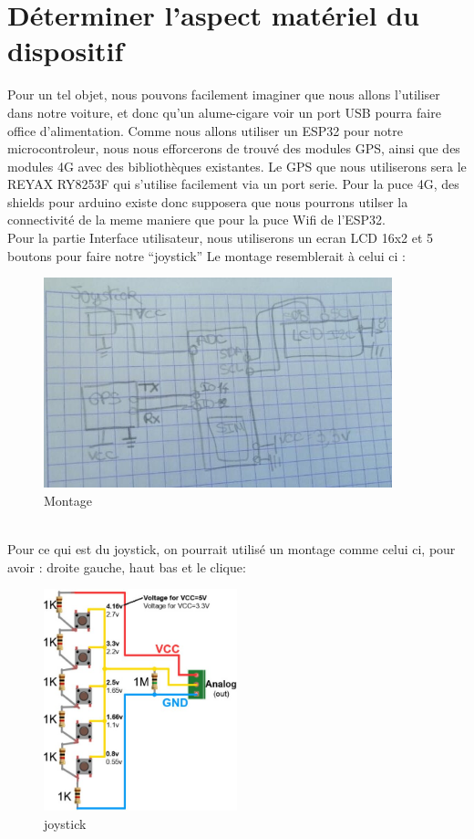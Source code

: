 \documentclass[10pt,a4paper]{article}
\begin{document}
\section{Déterminer l'aspect matériel du dispositif}
 
 Pour un tel objet, nous pouvons facilement imaginer que nous allons l'utiliser dans notre voiture, et donc qu'un alume-cigare voir un port USB pourra faire office d'alimentation. 
 Comme nous allons utiliser un ESP32 pour notre microcontroleur, nous nous efforcerons de trouvé des modules GPS, ainsi que des modules 4G avec des bibliothèques existantes.
 Le GPS que nous utiliserons sera le REYAX RY8253F qui s'utilise facilement via un port serie. 
 Pour la puce 4G, des shields pour arduino existe donc supposera que nous pourrons utilser la connectivité de la meme maniere que pour la puce Wifi de l'ESP32.\\
 Pour la partie Interface utilisateur, nous utiliserons un ecran LCD 16x2 et 5 boutons pour faire notre ``joystick''
 Le montage resemblerait à celui ci :\\
 \begin{figure}[h!]
\centering
\includegraphics[width=0.9\textwidth]{2.jpg}
\caption{Montage}
\label{fig:universe}
\end{figure}\\
Pour ce qui est du joystick, on pourrait utilisé un montage comme celui ci, pour avoir : droite gauche, haut bas et le clique:\\
\begin{figure}[h!]
\centering
\includegraphics[width=0.5\textwidth]{3.jpg}
\caption{joystick}
\label{fig:universe}
\end{figure}



 
 
 
 
 
\end{document}
